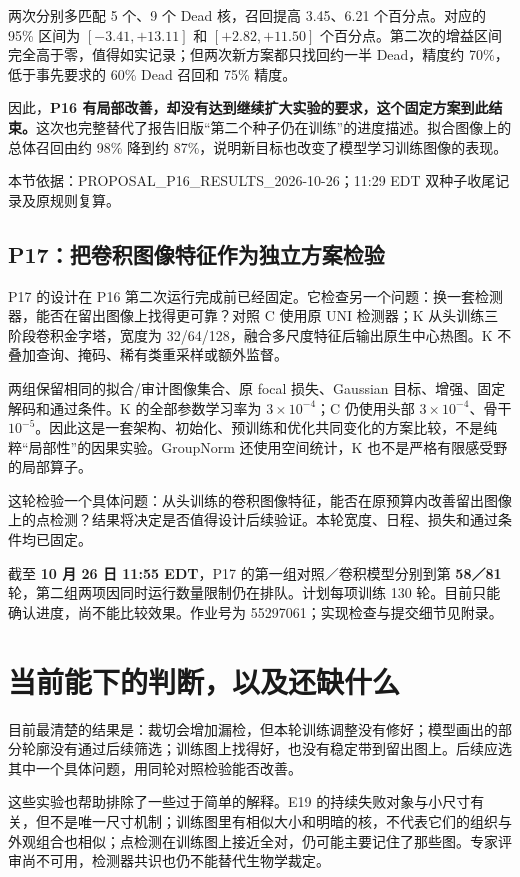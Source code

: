 \documentclass[UTF8,zihao=-4,fontset=windows]{ctexart}
\newcommand{\src}[1]{\par{\footnotesize\color{gray}本节依据：#1}\par}
\begin{document}
两次分别多匹配 5 个、9 个 Dead 核，召回提高 3.45、6.21 个百分点。对应的 95\% 区间为 $[-3.41,+13.11]$ 和 $[+2.82,+11.50]$ 个百分点。第二次的增益区间完全高于零，值得如实记录；但两次新方案都只找回约一半 Dead，精度约 70\%，低于事先要求的 60\% Dead 召回和 75\% 精度。

因此，\textbf{P16 有局部改善，却没有达到继续扩大实验的要求，这个固定方案到此结束。}这次也完整替代了报告旧版“第二个种子仍在训练”的进度描述。拟合图像上的总体召回由约 98\% 降到约 87\%，说明新目标也改变了模型学习训练图像的表现。

\src{PROPOSAL\_P16\_RESULTS\_2026-10-26；11:29 EDT 双种子收尾记录及原规则复算。}

\subsection{P17：把卷积图像特征作为独立方案检验}

P17 的设计在 P16 第二次运行完成前已经固定。它检查另一个问题：换一套检测器，能否在留出图像上找得更可靠？对照 C 使用原 UNI 检测器；K 从头训练三阶段卷积金字塔，宽度为 32/64/128，融合多尺度特征后输出原生中心热图。K 不叠加查询、掩码、稀有类重采样或额外监督。

两组保留相同的拟合/审计图像集合、原 focal 损失、Gaussian 目标、增强、固定解码和通过条件。K 的全部参数学习率为 $3\times10^{-4}$；C 仍使用头部 $3\times10^{-4}$、骨干 $10^{-5}$。因此这是一套架构、初始化、预训练和优化共同变化的方案比较，不是纯粹“局部性”的因果实验。GroupNorm 还使用空间统计，K 也不是严格有限感受野的局部算子。

这轮检验一个具体问题：从头训练的卷积图像特征，能否在原预算内改善留出图像上的点检测？结果将决定是否值得设计后续验证。本轮宽度、日程、损失和通过条件均已固定。

截至 \textbf{10 月 26 日 11:55 EDT}，P17 的第一组对照／卷积模型分别到第 \textbf{58／81} 轮，第二组两项因同时运行数量限制仍在排队。计划每项训练 130 轮。目前只能确认进度，尚不能比较效果。作业号为 55297061；实现检查与提交细节见附录。

\section{当前能下的判断，以及还缺什么}

目前最清楚的结果是：裁切会增加漏检，但本轮训练调整没有修好；模型画出的部分轮廓没有通过后续筛选；训练图上找得好，也没有稳定带到留出图上。后续应选其中一个具体问题，用同轮对照检验能否改善。

这些实验也帮助排除了一些过于简单的解释。E19 的持续失败对象与小尺寸有关，但不是唯一尺寸机制；训练图里有相似大小和明暗的核，不代表它们的组织与外观组合也相似；点检测在训练图上接近全对，仍可能主要记住了那些图。专家评审尚不可用，检测器共识也仍不能替代生物学裁定。
\end{document}
